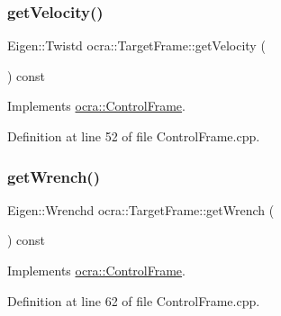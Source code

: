 \hypertarget{classocra_1_1TargetFrame_a5eeda88210d7002c3c73ba949139ed5b}{}\label{classocra_1_1TargetFrame_a5eeda88210d7002c3c73ba949139ed5b} 
\subsubsection{\texorpdfstring{get\+Velocity()}{getVelocity()}}
{\footnotesize\ttfamily Eigen\+::\+Twistd ocra\+::\+Target\+Frame\+::get\+Velocity (\begin{DoxyParamCaption}{ }\end{DoxyParamCaption}) const\hspace{0.3cm}{\ttfamily [virtual]}}



Implements \hyperlink{classocra_1_1ControlFrame_a398df839f75886867c86a8e70ac9bf24}{ocra\+::\+Control\+Frame}.



Definition at line 52 of file Control\+Frame.\+cpp.

\hypertarget{classocra_1_1TargetFrame_a5e9ccc5e2e5ae8e52a37b5810a76115d}{}\label{classocra_1_1TargetFrame_a5e9ccc5e2e5ae8e52a37b5810a76115d} 
\subsubsection{\texorpdfstring{get\+Wrench()}{getWrench()}}
{\footnotesize\ttfamily Eigen\+::\+Wrenchd ocra\+::\+Target\+Frame\+::get\+Wrench (\begin{DoxyParamCaption}{ }\end{DoxyParamCaption}) const\hspace{0.3cm}{\ttfamily [virtual]}}



Implements \hyperlink{classocra_1_1ControlFrame_a069aaf1eab98598fbffee263fcde0c56}{ocra\+::\+Control\+Frame}.



Definition at line 62 of file Control\+Frame.\+cpp.

\hypertarget{classocra_1_1TargetFrame_a3cbbcab6f3179320bd6c6f8c5aeabc75}{}\label{classocra_1_1TargetFrame_a3cbbcab6f3179320bd6c6f8c5aeabc75} 
